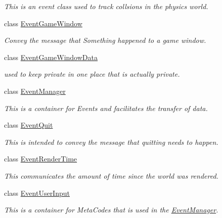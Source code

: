 \begin{DoxyCompactItemize}
\begin{DoxyCompactList}\small\item\em This is an event class used to track collsions in the physics world. \item\end{DoxyCompactList}\item 
class \hyperlink{classMezzanine_1_1EventGameWindow}{EventGameWindow}
\begin{DoxyCompactList}\small\item\em Convey the message that Something happened to a game window. \item\end{DoxyCompactList}\item 
class \hyperlink{classMezzanine_1_1EventGameWindowData}{EventGameWindowData}
\begin{DoxyCompactList}\small\item\em used to keep private in one place that is actually private. \item\end{DoxyCompactList}\item 
class \hyperlink{classMezzanine_1_1EventManager}{EventManager}
\begin{DoxyCompactList}\small\item\em This is a container for Events and facilitates the transfer of data. \item\end{DoxyCompactList}\item 
class \hyperlink{classMezzanine_1_1EventQuit}{EventQuit}
\begin{DoxyCompactList}\small\item\em This is intended to convey the message that quitting needs to happen. \item\end{DoxyCompactList}\item 
class \hyperlink{classMezzanine_1_1EventRenderTime}{EventRenderTime}
\begin{DoxyCompactList}\small\item\em This communicates the amount of time since the world was rendered. \item\end{DoxyCompactList}\item 
class \hyperlink{classMezzanine_1_1EventUserInput}{EventUserInput}
\begin{DoxyCompactList}\small\item\em This is a container for MetaCodes that is used in the \hyperlink{classMezzanine_1_1EventManager}{EventManager}. \item\end{DoxyCompactList}\item 

\end{DoxyCompactItemize}
